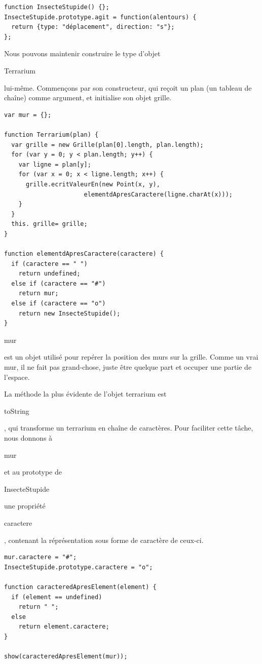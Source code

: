 \documentclass{FramateX}
\renewcommand{\texttt}[1]{\begin{sffamily}{#1}\end{sffamily}}
\begin{document}
\begin{lstlisting}
function InsecteStupide() {};
InsecteStupide.prototype.agit = function(alentours) {
  return {type: "déplacement", direction: "s"};
};
\end{lstlisting}
\begin{center}\end{center}

Nous pouvons maintenir construire le type d'objet \texttt{Terrarium}
lui-même. Commençons par son constructeur, qui reçoit un plan (un
tableau de chaîne) comme argument, et initialise son objet grille.

\begin{lstlisting}
var mur = {};

function Terrarium(plan) {
  var grille = new Grille(plan[0].length, plan.length);
  for (var y = 0; y < plan.length; y++) {
    var ligne = plan[y];
    for (var x = 0; x < ligne.length; x++) {
      grille.ecritValeurEn(new Point(x, y),
                      elementdApresCaractere(ligne.charAt(x)));
    }
  }
  this. grille= grille;
}

function elementdApresCaractere(caractere) {
  if (caractere == " ")
    return undefined;
  else if (caractere == "#")
    return mur;
  else if (caractere == "o")
    return new InsecteStupide();
}
\end{lstlisting}
\texttt{mur} est un objet utilisé pour repérer la position des murs sur
la grille. Comme un vrai mur, il ne fait pas grand-chose, juste être
quelque part et occuper une partie de l'espace.

\begin{center}\end{center}

La méthode la plus évidente de l'objet terrarium est \texttt{toString},
qui transforme un terrarium en chaîne de caractères. Pour faciliter
cette tâche, nous donnons à \texttt{mur} et au prototype de
\texttt{InsecteStupide} une propriété \texttt{caractere}, contenant la
réprésentation sous forme de caractère de ceux-ci.

\begin{lstlisting}
mur.caractere = "#";
InsecteStupide.prototype.caractere = "o";

function caracteredApresElement(element) {
  if (element == undefined)
    return " ";
  else
    return element.caractere;
}

show(caracteredApresElement(mur));
\end{lstlisting}
\begin{center}\end{center}
\end{document}
